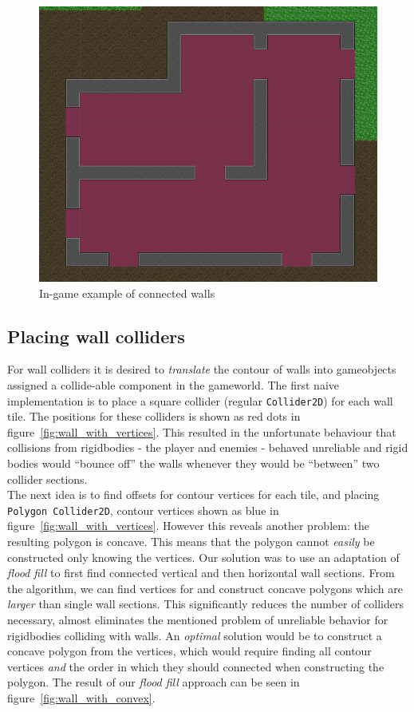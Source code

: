 \begin{figure}[H]
    \centering
    \includegraphics[width=1\textwidth]{figures/generating_levels/walls_ingame.png}
    \caption{In-game example of connected walls}\label{fig:walls_ingame} 
\end{figure}

\subsection{Placing wall colliders}
For wall colliders it is desired to \textit{translate} the contour of walls into gameobjects assigned a collide-able component in the gameworld.
The first naive implementation is to place a square collider (regular \texttt{Collider2D}) for each wall tile.
The positions for these colliders is shown as red dots in figure~\ref{fig:wall_with_vertices}.
This resulted in the unfortunate behaviour that collisions from rigidbodies - the player and enemies - behaved unreliable and rigid bodies would ``bounce off'' the walls whenever they would be ``between'' two collider sections.
\\
The next idea is to find offsets for contour vertices for each tile, and placing \texttt{Polygon Collider2D}, contour vertices shown as blue in figure~\ref{fig:wall_with_vertices}. 
However this reveals another problem: the resulting polygon is concave.
This means that the polygon cannot \textit{easily} be constructed only knowing the vertices.
Our solution was to use an adaptation of \textit{flood fill} to first find connected vertical and then horizontal wall sections.
From the algorithm, we can find vertices for and construct concave polygons which are \textit{larger} than single wall sections.
This significantly reduces the number of colliders necessary, almost eliminates the mentioned problem of unreliable behavior for rigidbodies colliding with walls.
An \textit{optimal} solution would be to construct a concave polygon from the vertices, which would require finding all
contour vertices \textit{and} the order in which they should connected when constructing the polygon.
The result of our \textit{flood fill} approach can be seen in figure~\ref{fig:wall_with_convex}.


